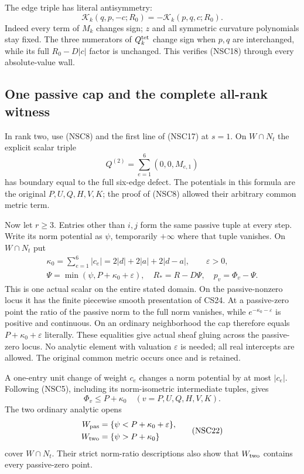 The edge triple has literal antisymmetry:
\[
          \mathcal K_k(q,p,-c;R_0)
                         =-\mathcal K_k(p,q,c;R_0).
 \tag{NSC18}
\]
Indeed every term of $M_k$ changes sign; $z$ and
all symmetric curvature polynomials stay fixed.
The three numerators of $Q_k^{\rm tet}$ change sign
when $p,q$ are interchanged, while its full
$R_0-D|c|$ factor is unchanged.  This verifies
(NSC18) through every absolute-value wall.

\subsection{One passive cap and the complete all-rank witness}

In rank two, use (NSC8) and the first line of (NSC17)
at $s=1$.  On $W\cap N_t$ the explicit scalar triple
\[
        Q^{(2)}=\sum_{e=1}^{6}(0,0,M_{e,1})
 \tag{NSC19}
\]
has boundary equal to the full six-edge defect.
The potentials in this formula are the original
$P,U,Q,H,V,K$; the proof of (NSC8) allowed their
arbitrary common metric term.

Now let $r\geq3$.  Entries other than $i,j$ form the
same passive tuple at every step.  Write its norm
potential as $\psi$, temporarily $+\infty$ where
that tuple vanishes.  On $W\cap N_t$ put
\[
 \begin{gathered}
 \kappa_0=\sum_{e=1}^6|c_e|
              =2|d|+2|a|+2|d-a|,\qquad \varepsilon>0,\\
 \Psi=\min(\psi,P+\kappa_0+\varepsilon),\quad
 R_*=R-D\Psi,\quad p_v=\Phi_v-\Psi .
 \end{gathered}
 \tag{NSC20}
\]
This is one actual scalar on the entire stated domain.
On the passive-nonzero locus it has the finite
piecewise smooth presentation of CS24.  At a passive-zero
point the ratio of the passive norm to the full norm
vanishes, while $e^{-\kappa_0-\varepsilon}$ is positive
and continuous.  On an ordinary neighborhood the cap
therefore equals $P+\kappa_0+\varepsilon$ literally.
These equalities give actual sheaf gluing across the
passive-zero locus.  No analytic element with valuation
$\varepsilon$ is needed; all real intercepts are allowed.
The original common metric occurs once and is retained.

A one-entry unit change of weight $c_e$ changes a norm
potential by at most $|c_e|$.  Following (NSC5), including
its norm-isometric intermediate tuples, gives
\[
          \Phi_v\leq P+\kappa_0
                    \quad(v=P,U,Q,H,V,K).
 \tag{NSC21}
\]
The two ordinary analytic opens
\[
 \begin{split}
 W_{\rm pas}&=\{\psi<P+\kappa_0+\varepsilon\},\\
 W_{\rm two}&=\{\psi>P+\kappa_0\}
 \end{split}
 \tag{NSC22}
\]
cover $W\cap N_t$.  Their strict norm-ratio descriptions
also show that $W_{\rm two}$ contains every passive-zero
point.

